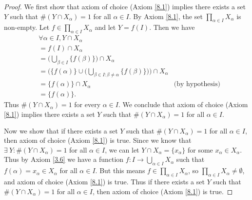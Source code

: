 \begin{proof}
    We first show that axiom of choice (Axiom \ref{8.1}) implies there exists a set \(Y\) such that \(\#(Y \cap X_{\alpha}) = 1\) for all \(\alpha \in I\).
    By Axiom \ref{8.1}, the set \(\prod_{\alpha \in I} X_{\alpha}\) is non-empty.
    Let \(f \in \prod_{\alpha \in I} X_{\alpha}\) and let \(Y = f(I)\).
    Then we have
    \begin{align*}
         & \forall \alpha \in I, Y \cap X_{\alpha}                                                                                                      \\
         & = f(I) \cap X_{\alpha}                                                                                                                       \\
         & = \Bigg(\bigcup_{\beta \in I} \{f(\beta)\}\Bigg) \cap X_{\alpha}                                                                             \\
         & = \Bigg(\{f(\alpha)\} \cup \bigg(\bigcup_{\beta \in I : \beta \neq \alpha} \{f(\beta)\}\bigg)\Bigg) \cap X_{\alpha}                          \\
         & = \{f(\alpha)\} \cap X_{\alpha}                                                                                     & \text{(by hypothesis)} \\
         & = \{f(\alpha)\}.
    \end{align*}
    Thus \(\#(Y \cap X_{\alpha}) = 1\) for every \(\alpha \in I\).
    We conclude that axiom of choice (Axiom \ref{8.1}) implies there exists a set \(Y\) such that \(\#(Y \cap X_{\alpha}) = 1\) for all \(\alpha \in I\).

    Now we show that if there exists a set \(Y\) such that \(\#(Y \cap X_{\alpha}) = 1\) for all \(\alpha \in I\), then axiom of choice (Axiom \ref{8.1}) is true.
    Since we know that \(\exists\ Y : \#(Y \cap X_{\alpha}) = 1\) for all \(\alpha \in I\), we can let \(Y \cap X_{\alpha} = \{x_{\alpha}\}\) for some \(x_{\alpha} \in X_{\alpha}\).
    Thus by Axiom \ref{3.6} we have a function \(f : I \to \bigcup_{\alpha \in I} X_{\alpha}\) such that \(f(\alpha) = x_{\alpha} \in X_{\alpha}\) for all \(\alpha \in I\).
    But this means \(f \in \prod_{\alpha \in I} X_{\alpha}\), so \(\prod_{\alpha \in I} X_{\alpha} \neq \emptyset\), and axiom of choice (Axiom \ref{8.1}) is true.
    Thus if there exists a set \(Y\) such that \(\#(Y \cap X_{\alpha}) = 1\) for all \(\alpha \in I\), then axiom of choice (Axiom \ref{8.1}) is true.
\end{proof}

